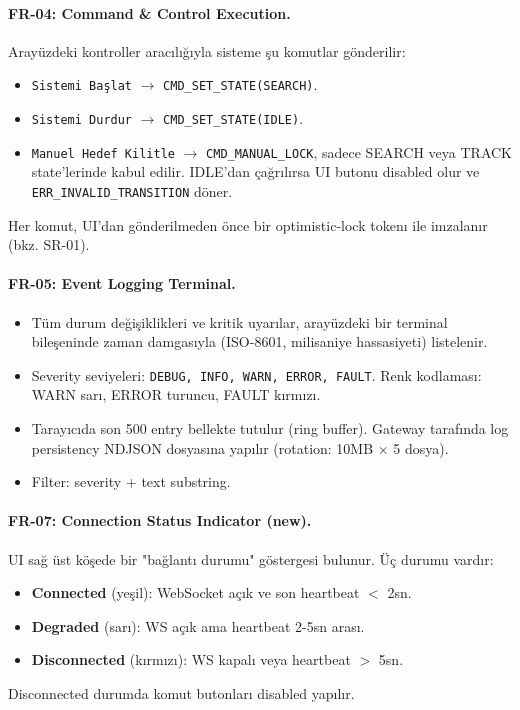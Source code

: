 \paragraph{FR-04: Command \& Control Execution.}
Arayüzdeki kontroller aracılığıyla sisteme şu komutlar gönderilir:
\begin{itemize}
    \item \texttt{Sistemi Başlat} $\rightarrow$ \texttt{CMD\_SET\_STATE(SEARCH)}.
    \item \texttt{Sistemi Durdur} $\rightarrow$ \texttt{CMD\_SET\_STATE(IDLE)}.
    \item \texttt{Manuel Hedef Kilitle} $\rightarrow$ \texttt{CMD\_MANUAL\_LOCK}, sadece SEARCH veya TRACK state'lerinde kabul edilir. IDLE'dan çağrılırsa UI butonu disabled olur ve \texttt{ERR\_INVALID\_TRANSITION} döner.
\end{itemize}
Her komut, UI'dan gönderilmeden önce bir optimistic-lock tokenı ile imzalanır (bkz. SR-01).

\paragraph{FR-05: Event Logging Terminal.}
\begin{itemize}
    \item Tüm durum değişiklikleri ve kritik uyarılar, arayüzdeki bir terminal bileşeninde zaman damgasıyla (ISO-8601, milisaniye hassasiyeti) listelenir.
    \item Severity seviyeleri: \texttt{DEBUG, INFO, WARN, ERROR, FAULT}. Renk kodlaması: WARN sarı, ERROR turuncu, FAULT kırmızı.
    \item Tarayıcıda son 500 entry bellekte tutulur (ring buffer). Gateway tarafında log persistency NDJSON dosyasına yapılır (rotation: 10MB $\times$ 5 dosya).
    \item Filter: severity + text substring.
\end{itemize}

\paragraph{FR-07: Connection Status Indicator (new).}
UI sağ üst köşede bir "bağlantı durumu" göstergesi bulunur. Üç durumu vardır:
\begin{itemize}
    \item \textbf{Connected} (yeşil): WebSocket açık ve son heartbeat $<$ 2sn.
    \item \textbf{Degraded} (sarı): WS açık ama heartbeat 2-5sn arası.
    \item \textbf{Disconnected} (kırmızı): WS kapalı veya heartbeat $>$ 5sn.
\end{itemize}
Disconnected durumda komut butonları disabled yapılır.

